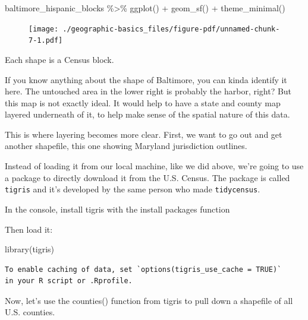 \documentclass[
  letterpaper,
  DIV=11,
  numbers=noendperiod]{scrreprt}
\newenvironment{Shaded}{\begin{snugshade}}{\end{snugshade}}
\newcommand{\FunctionTok}[1]{\textcolor[rgb]{0.28,0.35,0.67}{#1}}
\newcommand{\NormalTok}[1]{\textcolor[rgb]{0.00,0.23,0.31}{#1}}
\newcommand{\SpecialCharTok}[1]{\textcolor[rgb]{0.37,0.37,0.37}{#1}}
\begin{document}
\begin{Shaded}
\begin{Highlighting}[]
\NormalTok{baltimore\_hispanic\_blocks }\SpecialCharTok{\%\textgreater{}\%}
  \FunctionTok{ggplot}\NormalTok{() }\SpecialCharTok{+}
  \FunctionTok{geom\_sf}\NormalTok{() }\SpecialCharTok{+}
  \FunctionTok{theme\_minimal}\NormalTok{()}
\end{Highlighting}
\end{Shaded}

\begin{figure}[H]

{\centering \texttt{[image: ./geographic-basics\_files/figure-pdf/unnamed-chunk-7-1.pdf]}

}

\end{figure}

Each shape is a Census block.

If you know anything about the shape of Baltimore, you can kinda
identify it here. The untouched area in the lower right is probably the
harbor, right? But this map is not exactly ideal. It would help to have
a state and county map layered underneath of it, to help make sense of
the spatial nature of this data.

This is where layering becomes more clear. First, we want to go out and
get another shapefile, this one showing Maryland jurisdiction outlines.

Instead of loading it from our local machine, like we did above, we're
going to use a package to directly download it from the U.S. Census. The
package is called \texttt{tigris} and it's developed by the same person
who made \texttt{tidycensus}.

In the console, install tigris with the install packages function

Then load it:

\begin{Shaded}
\begin{Highlighting}[]
\FunctionTok{library}\NormalTok{(tigris)}
\end{Highlighting}
\end{Shaded}

\begin{verbatim}
To enable caching of data, set `options(tigris_use_cache = TRUE)`
in your R script or .Rprofile.
\end{verbatim}

Now, let's use the counties() function from tigris to pull down a
shapefile of all U.S. counties.
\end{document}
